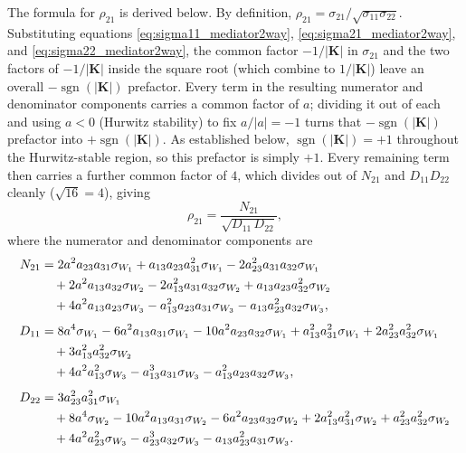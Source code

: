 \documentclass{article}
\begin{document}
The formula for $\rho_{21}$ is derived below. By definition, $\rho_{21}=\sigma_{21}/\sqrt{\sigma_{11}\sigma_{22}}$. Substituting equations
\ref{eq:sigma11_mediator2way}, \ref{eq:sigma21_mediator2way}, and \ref{eq:sigma22_mediator2way},
the common factor $-1/|\mathbf{K}|$ in $\sigma_{21}$ and the two factors of $-1/|\mathbf{K}|$
inside the square root (which combine to $1/|\mathbf{K}|$) leave an overall
$-\operatorname{sgn}(|\mathbf{K}|)$ prefactor. Every term in the resulting numerator and
denominator components carries a common factor of $a$; dividing it out of each and using
$a<0$ (Hurwitz stability) to fix $a/|a|=-1$ turns that $-\operatorname{sgn}(|\mathbf{K}|)$
prefactor into $+\operatorname{sgn}(|\mathbf{K}|)$. As established below,
$\operatorname{sgn}(|\mathbf{K}|)=+1$ throughout the Hurwitz-stable region, so this prefactor is
simply $+1$. Every remaining term then carries a further
common factor of $4$, which divides out of $N_{21}$ and $D_{11}D_{22}$ cleanly ($\sqrt{16}=4$),
giving
\begin{equation}
\rho_{21} = \frac{N_{21}}{\sqrt{D_{11}\,D_{22}}},
\label{eq:rho21_mediator2way}
\end{equation}
where the numerator and denominator components are
\begin{align}
N_{21} &= 2a^2a_{23}a_{31}\sigma_{W_1} + a_{13}a_{23}a_{31}^2\sigma_{W_1} - 2a_{23}^2a_{31}a_{32}\sigma_{W_1} \notag\\
&\quad+ 2a^2a_{13}a_{32}\sigma_{W_2} - 2a_{13}^2a_{31}a_{32}\sigma_{W_2} + a_{13}a_{23}a_{32}^2\sigma_{W_2} \notag\\
&\quad+ 4a^2a_{13}a_{23}\sigma_{W_3} - a_{13}^2a_{23}a_{31}\sigma_{W_3} - a_{13}a_{23}^2a_{32}\sigma_{W_3},
\label{eq:N21_med2way}\\[4pt]
D_{11} &= 8a^4\sigma_{W_1} - 6a^2a_{13}a_{31}\sigma_{W_1} - 10a^2a_{23}a_{32}\sigma_{W_1} + a_{13}^2a_{31}^2\sigma_{W_1} + 2a_{23}^2a_{32}^2\sigma_{W_1} \notag\\
&\quad+ 3a_{13}^2a_{32}^2\sigma_{W_2} \notag\\
&\quad+ 4a^2a_{13}^2\sigma_{W_3} - a_{13}^3a_{31}\sigma_{W_3} - a_{13}^2a_{23}a_{32}\sigma_{W_3},
\label{eq:D11_med2way}\\[4pt]
D_{22} &= 3a_{23}^2a_{31}^2\sigma_{W_1} \notag\\
&\quad+ 8a^4\sigma_{W_2} - 10a^2a_{13}a_{31}\sigma_{W_2} - 6a^2a_{23}a_{32}\sigma_{W_2} + 2a_{13}^2a_{31}^2\sigma_{W_2} + a_{23}^2a_{32}^2\sigma_{W_2} \notag\\
&\quad+ 4a^2a_{23}^2\sigma_{W_3} - a_{23}^3a_{32}\sigma_{W_3} - a_{13}a_{23}^2a_{31}\sigma_{W_3}.
\label{eq:D22_med2way}
\end{align}
\end{document}
